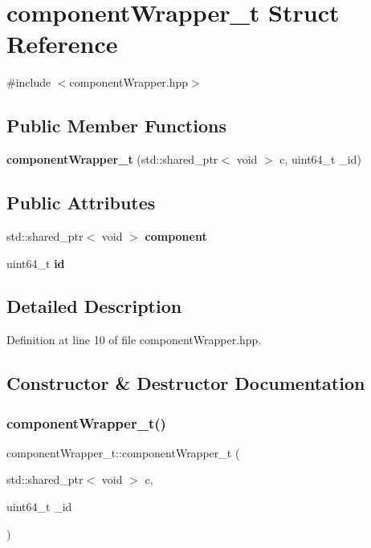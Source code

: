 \section{component\+Wrapper\+\_\+t Struct Reference}
\label{structcomponent_wrapper__t}


{\ttfamily \#include $<$component\+Wrapper.\+hpp$>$}

\subsection*{Public Member Functions}
\begin{DoxyCompactItemize}
\item 
\textbf{ component\+Wrapper\+\_\+t} (std\+::shared\+\_\+ptr$<$ void $>$ c, uint64\+\_\+t \+\_\+id)
\end{DoxyCompactItemize}
\subsection*{Public Attributes}
\begin{DoxyCompactItemize}
\item 
std\+::shared\+\_\+ptr$<$ void $>$ \textbf{ component}
\item 
uint64\+\_\+t \textbf{ id}
\end{DoxyCompactItemize}


\subsection{Detailed Description}


Definition at line 10 of file component\+Wrapper.\+hpp.



\subsection{Constructor \& Destructor Documentation}
\mbox{\label{structcomponent_wrapper__t_adbffb85d2e94fade3648baf5b2fdb3b0}} 
\subsubsection{component\+Wrapper\+\_\+t()}
{\footnotesize\ttfamily component\+Wrapper\+\_\+t\+::component\+Wrapper\+\_\+t (\begin{DoxyParamCaption}\item[{std\+::shared\+\_\+ptr$<$ void $>$}]{c,  }\item[{uint64\+\_\+t}]{\+\_\+id }\end{DoxyParamCaption})\hspace{0.3cm}{\ttfamily [inline]}}



